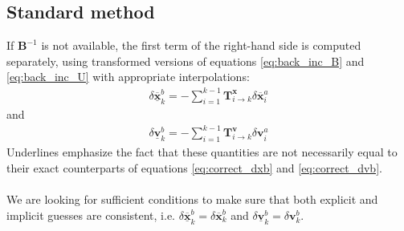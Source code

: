 \documentclass[12pt]{scrartcl}
\begin{document}
\subsection{Standard method}
If $\mathbf{B}^{-1}$ is not available, the first term of the right-hand side is computed separately, using transformed versions of equations \eqref{eq:back_inc_B} and \eqref{eq:back_inc_U} with appropriate interpolations:
\begin{align}
\label{eq:back_inc_Bvar}
\boxed{\delta \underline{\overline{\mathbf{x}}}^b_k = - \sum_{i=1}^{k-1} \mathbf{T}^\mathbf{x}_{i \rightarrow k} \delta \overline{\mathbf{x}}^a_i}
\end{align}
and 
\begin{align}
\label{eq:back_inc_Uvar}
\boxed{\delta \underline{\mathbf{v}}^b_k = - \sum_{i=1}^{k-1} \mathbf{T}^\mathbf{v}_{i \rightarrow k} \delta \mathbf{v}^a_i}
\end{align}
Underlines emphasize the fact that these quantities are not necessarily equal to their exact counterparts of equations \eqref{eq:correct_dxb} and \eqref{eq:correct_dvb}.\\
$  $\\
We are looking for sufficient conditions to make sure that both explicit and implicit guesses are consistent, i.e. $\delta \underline{\overline{\mathbf{x}}}^b_k = \delta \overline{\mathbf{x}}^b_k$ and $\delta \underline{\mathbf{v}}^b_k = \delta \mathbf{v}^b_k$.
\end{document}
